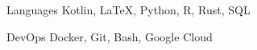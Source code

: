 

\begin{cvpairs}

  
\cvpair
    {Languages} %
    {Kotlin, LaTeX, Python, R, Rust, SQL} %


\cvpair
    {DevOps} %
    {Docker, Git, Bash, Google Cloud} %

\end{cvpairs}